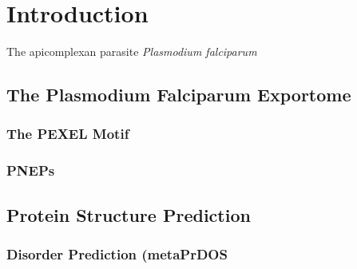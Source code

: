 \documentclass[fleqn,10pt]{SelfArx} %
\begin{document}
\flushbottom %

\maketitle %

\tableofcontents %

\thispagestyle{empty} %


\newcommand{\bn}
[1]{\textit{#1}}

\newcommand{\pf}
{\bn{P. falciparum}}

\section{Introduction} 

The apicomplexan parasite \bn{Plasmodium falciparum} 


\subsection{The Plasmodium Falciparum Exportome}
\subsubsection*{The PEXEL Motif}
\subsubsection*{PNEPs}
\subsection{Protein Structure Prediction}

\subsubsection*{Disorder Prediction (metaPrDOS}
\end{document}
